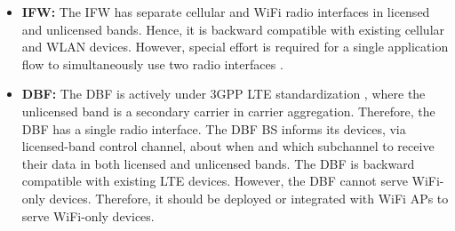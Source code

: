 \documentclass[journal,final,letterpaper,10pt,doublecolumn,twoside]{IEEEtran}
\begin{document}
\begin{itemize}
  \item \textbf{IFW:}
The IFW has separate cellular and WiFi radio interfaces in licensed
and unlicensed bands. Hence, it is backward compatible with existing
cellular and WLAN devices. However, special effort is required for a
single application flow to simultaneously use two radio interfaces
\cite{femto-forum-IFW}.

  \item \textbf{DBF:}
The DBF is actively under 3GPP LTE standardization
\cite{3GPP2014LTE-U},  where the unlicensed band is a secondary carrier in carrier aggregation.
Therefore, the DBF has a single radio interface. The DBF BS informs
its devices, via licensed-band control channel, about when and which
subchannel to receive their data in both licensed and unlicensed
bands. The DBF is backward compatible with existing LTE devices.
However, the DBF cannot serve WiFi-only devices. Therefore, it should be deployed or integrated with WiFi APs to serve WiFi-only devices.
\end{itemize}
\end{document}
